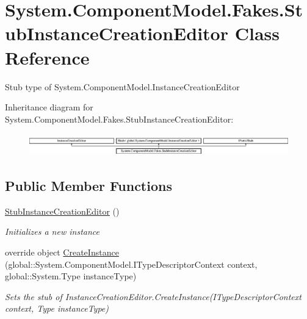 \hypertarget{class_system_1_1_component_model_1_1_fakes_1_1_stub_instance_creation_editor}{\section{System.\-Component\-Model.\-Fakes.\-Stub\-Instance\-Creation\-Editor Class Reference}
\label{class_system_1_1_component_model_1_1_fakes_1_1_stub_instance_creation_editor}
}


Stub type of System.\-Component\-Model.\-Instance\-Creation\-Editor 


Inheritance diagram for System.\-Component\-Model.\-Fakes.\-Stub\-Instance\-Creation\-Editor\-:\begin{figure}[H]
\begin{center}
\leavevmode
\includegraphics[height=0.972222cm]{class_system_1_1_component_model_1_1_fakes_1_1_stub_instance_creation_editor}
\end{center}
\end{figure}
\subsection*{Public Member Functions}
\begin{DoxyCompactItemize}
\item 
\hyperlink{class_system_1_1_component_model_1_1_fakes_1_1_stub_instance_creation_editor_a35fe36735d1824033657bebb12a4353a}{Stub\-Instance\-Creation\-Editor} ()
\begin{DoxyCompactList}\small\item\em Initializes a new instance\end{DoxyCompactList}\item 
override object \hyperlink{class_system_1_1_component_model_1_1_fakes_1_1_stub_instance_creation_editor_a190b9ddf31798bac865073bdf022f742}{Create\-Instance} (global\-::\-System.\-Component\-Model.\-I\-Type\-Descriptor\-Context context, global\-::\-System.\-Type instance\-Type)
\begin{DoxyCompactList}\small\item\em Sets the stub of Instance\-Creation\-Editor.\-Create\-Instance(\-I\-Type\-Descriptor\-Context context, Type instance\-Type)\end{DoxyCompactList}\end{DoxyCompactItemize}
